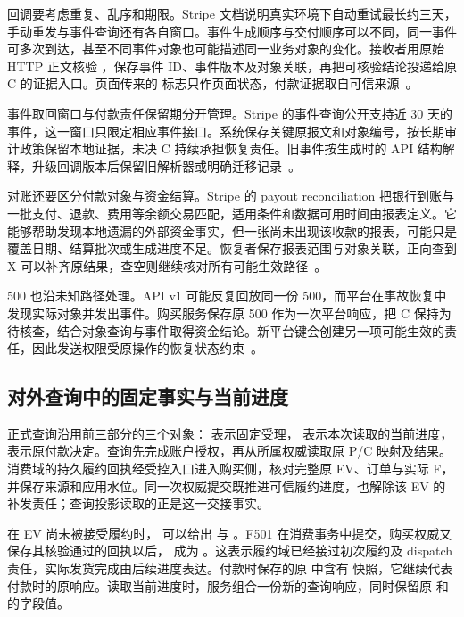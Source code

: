 回调要考虑重复、乱序和期限。Stripe 文档说明真实环境下自动重试最长约三天，手动重发与事件查询还有各自窗口。事件生成顺序与交付顺序可以不同，同一事件可多次到达，甚至不同事件对象也可能描述同一业务对象的变化。接收者用原始 HTTP 正文核验 ，保存事件 ID、事件版本及对象关联，再把可核验结论投递给原 C 的证据入口。页面传来的  标志只作页面状态，付款证据取自可信来源~\cite{stripe-webhooks}。

事件取回窗口与付款责任保留期分开管理。Stripe 的事件查询公开支持近 30 天的事件，这一窗口只限定相应事件接口。系统保存关键原报文和对象编号，按长期审计政策保留本地证据，未决 C 持续承担恢复责任。旧事件按生成时的 API 结构解释，升级回调版本后保留旧解析器或明确迁移记录~\cite{stripe-object-recovery}。

对账还要区分付款对象与资金结算。Stripe 的 payout reconciliation 把银行到账与一批支付、退款、费用等余额交易匹配，适用条件和数据可用时间由报表定义。它能够帮助发现本地遗漏的外部资金事实，但一张尚未出现该收款的报表，可能只是覆盖日期、结算批次或生成进度不足。恢复者保存报表范围与对象关联，正向查到 X 可以补齐原结果，查空则继续核对所有可能生效路径~\cite{stripe-payout-reconciliation}。

500 也沿未知路径处理。API v1 可能反复回放同一份 500，而平台在事故恢复中发现实际对象并发出事件。购买服务保存原 500 作为一次平台响应，把 C 保持为待核查，结合对象查询与事件取得资金结论。新平台键会创建另一项可能生效的责任，因此发送权限受原操作的恢复状态约束~\cite{stripe-v1-idempotency}。

\subsection{对外查询中的固定事实与当前进度}

正式查询沿用前三部分的三个对象： 表示固定受理， 表示本次读取的当前进度， 表示原付款决定。查询先完成账户授权，再从所属权威读取原 P/C 映射及结果。消费域的持久履约回执经受控入口进入购买侧，核对完整原 EV、订单与实际 F，并保存来源和应用水位。同一次权威提交既推进可信履约进度，也解除该 EV 的补发责任；查询投影读取的正是这一交接事实。


在 EV 尚未被接受履约时， 可以给出  与 。F501 在消费事务中提交，购买权威又保存其核验通过的回执以后， 成为 。这表示履约域已经接过初次履约及 dispatch 责任，实际发货完成由后续进度表达。付款时保存的原  中含有  快照，它继续代表付款时的原响应。读取当前进度时，服务组合一份新的查询响应，同时保留原  和  的字段值。

